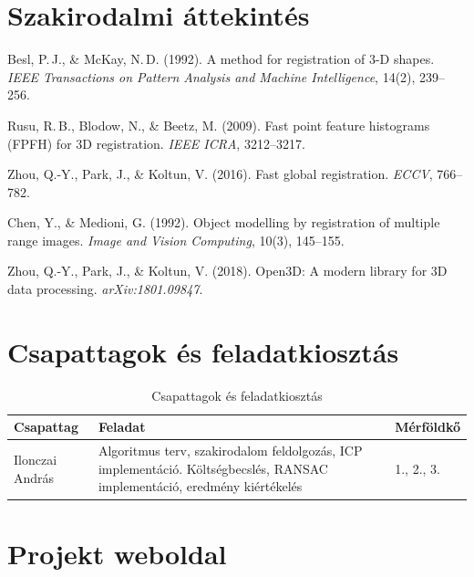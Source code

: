 \documentclass[12pt,a4paper]{article}
\begin{document}
\section{Szakirodalmi áttekintés}

\begin{thebibliography}{9}
    Besl, P.\,J., \& McKay, N.\,D. (1992).
    A method for registration of 3-D shapes.
    \textit{IEEE Transactions on Pattern Analysis and Machine Intelligence}, 14(2), 239--256.

    Rusu, R.\,B., Blodow, N., \& Beetz, M. (2009).
    Fast point feature histograms (FPFH) for 3D registration.
    \textit{IEEE ICRA}, 3212--3217.

    Zhou, Q.-Y., Park, J., \& Koltun, V. (2016).
    Fast global registration.
    \textit{ECCV}, 766--782.

    Chen, Y., \& Medioni, G. (1992).
    Object modelling by registration of multiple range images.
    \textit{Image and Vision Computing}, 10(3), 145--155.

    Zhou, Q.-Y., Park, J., \& Koltun, V. (2018).
    Open3D: A modern library for 3D data processing.
    \textit{arXiv:1801.09847}.
\end{thebibliography}

\section{Csapattagok és feladatkiosztás}

\begin{table}[h!]
\centering
\begin{tabular}{L{3.5cm} L{7cm} C{2.5cm}}
\toprule
\textbf{Csapattag} & \textbf{Feladat} & \textbf{Mérföldkő} \\
\midrule
Ilonczai András &
  Algoritmus terv, szakirodalom feldolgozás, ICP implementáció.
  Költségbecslés, RANSAC implementáció, eredmény kiértékelés &
  1., 2., 3. \\
\bottomrule
\end{tabular}
\caption{Csapattagok és feladatkiosztás}
\end{table}

\section{Projekt weboldal}
\end{document}
